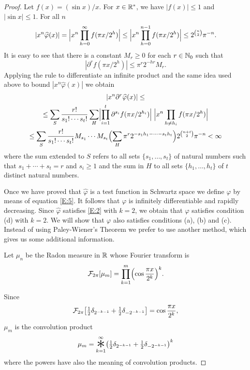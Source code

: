 \documentclass[10pt]{amsart}
\theoremstyle{definition}
\theoremstyle{remark}
\DeclareMathOperator*{\Conv}{\raisebox{-0.6ex}{\scalebox{2.5}{$\ast$}}}
\begin{document}
\begin{proof}
Let $f(x)=(\sin x)/x$. For $x\in\mathbb{R}^*$, we have $|f(x)|\le 1$ and $|\sin x|\le 1$. For
all $n$
\[|x^n\widehat\varphi(x)|=\Bigl|x^n \prod_{h=0}^\infty f(\pi x/2^h)\Bigr|\le \Bigl|x^n\prod_{h=0}^{n-1}
f(\pi x/2^h)\Bigr|\le 2^{\binom{n}{2}}\pi^{-n}.\]
It is easy to see that there is a constant $M_r\ge0$ for each $r\in\mathbb{N}_{0}$ such that
\[|\partial^r f(\pi x/2^h)|\le \pi^r2^{-hr}M_r.\]
Applying the rule to differentiate an infinite product and the same idea 
used above to bound $|x^n\widehat\varphi(x)|$ we obtain
\begin{multline*}
|x^n \partial^r \widehat\varphi(x)|\le\\
\le \sum_S\frac{r!}{s_1!\cdots s_t!}\sum_H\Bigl|\prod_{i=1}^t \partial ^{s_i}f(\pi x/2^{h_i})\Bigr|\;
\Bigr|x^n\prod_{h\ne h_i}f(\pi x/2^h)\Bigr|\\
\le \sum_S\frac{r!}{s_1!\cdots s_t!}M_{s_1}\cdots M_{s_t}\Bigl(\sum_H\pi^r2^{-s_1h_1-\cdots-s_t h_t}\Bigr)2^{\binom{n+t}{2}}\pi^{-n}<\infty
\end{multline*}
where the sum extended to $S$ refers to all sets $\{s_1,\dots, s_t\}$ of natural numbers such 
that $s_1+\cdots+s_t=r$ and $s_i\ge1$ and the sum in $H$ to all sets $\{h_1,\dots, h_t\}$
of $t$ distinct  natural numbers. 

Once we have proved that $\widehat\varphi$ is a test function in Schwartz space we define $\varphi$ 
by means of equation \eqref{E:5}. It follows that $\varphi$ is infinitely differentiable 
and rapidly decreasing. Since $\widehat\varphi$ satisfies \eqref{E:2} with $k=2$, we obtain 
that $\varphi$ satisfies condition (d) with $k=2$.  We will show that $\varphi$ also satisfies
conditions (a), (b) and (c). Instead of using Paley-Wiener's Theorem we prefer 
to use another method,
which gives us some additional information.

Let $\mu_n$ be the Radon measure in $\mathbb{R}$ whose Fourier transform is
\begin{equation}\label{E:10}
\mathcal{F}_{2\pi}\!\left[\mu_m\right]=\prod_{k=1}^m\Bigl(\cos\frac{\pi x}{2^k}\Bigr)^k.
\end{equation}

Since
\begin{equation}\label{E:11}
\mathcal{F}_{2\pi}\!\left[\tfrac12\delta_{2^{-k-1}}+\tfrac12\delta_{-2^{-k-1}}\right]
=\cos\frac{\pi x}{2^k},
\end{equation}
$\mu_m$ is the convolution product 
\begin{equation}\label{E:12}
\mu_m=\Conv_{k=1}^\infty\bigl(\tfrac12\delta_{2^{-k-1}}+\tfrac12\delta_{-2^{-k-1}}
\bigr)^k
\end{equation}
where the powers have also the meaning of convolution products. 


\end{proof}
\end{document}

